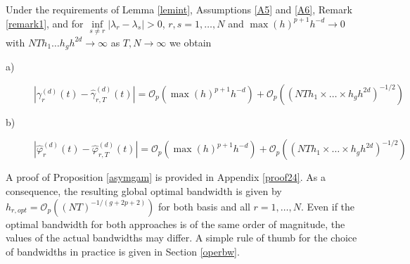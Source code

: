 \begin{proposition}
\label{asymgam}
Under the requirements of Lemma \ref{lemint}, Assumptions \ref{A5} and \ref{A6}, Remark \ref{remark1}, and for $\underset{s\neq r}{\operatorname{inf}} |\lambda_r-\lambda_s|>0$, $r,s=1,\dots, N$ and  $\max(h)^{p+1} h^{ -d } \rightarrow 0$ with $N T h_1\dots h_g  h^{2d}  \rightarrow \infty$ as $T,N \rightarrow \infty$ we obtain 
\begin{description}
 \item[a)] $|\gamma^{(d )}_r(t) - \hat{\gamma}_{r,T}^{(d )}(t)| =  \mathcal{O}_p\left( \max(h)^{p+1} h^{-d}\right) +\mathcal{O}_p\left((N T  h_1 \times \dots \times h_g  h^{2d} )^{-1/2} \right)$%
 \item[b)]$|\hat{\varphi}^{(d)}_r(t) - \hat{\varphi}^{(d)}_{r,T}(t)| = \mathcal{O}_p\left( \max(h)^{p+1} h^{-d}\right) +\mathcal{O}_p\left((N T h_1 \times \dots \times h_g  h^{2d} )^{-1/2} \right)$%
\end{description}
\end{proposition}
A proof of Proposition \ref{asymgam} is provided in Appendix \ref{proof24}. As a consequence, the resulting global optimal bandwidth is given by $h_{r,opt} = \mathcal{O}_p \left( (NT)^{-1/(g+2p+2)}\right)$ for both basis and all $r=1,\dots,N$. 
Even if the optimal bandwidth for both approaches is of the same order of magnitude, the values of the actual bandwidths may differ. A simple rule of thumb for the choice of bandwidths in practice is given in Section \ref{operbw}.

